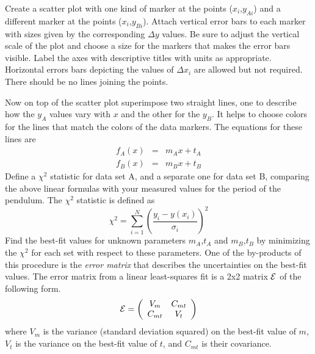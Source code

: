 \documentclass{revtex4}
\begin{document}
Create a scatter plot with one kind of marker at the points ($x_i$,$y_{Ai}$)
and a different marker at the points ($x_i$,$y_{Bi}$).  Attach vertical
error bars to each marker with sizes given by the corresponding  $\Delta y$
values.  Be sure to adjust the vertical scale of the plot and choose a size
for the markers that makes the error bars visible.  Label the axes with
descriptive titles with units as appropriate.  Horizontal errors bars
depicting the values of $\Delta x_i$ are allowed but not required.
There should be no lines joining the points.

Now on top of the scatter plot superimpose two straight lines, one to
describe how the $y_A$ values vary with $x$ and the other for the $y_B$.
It helps to choose colors for the lines that match the colors of the data
markers.  The equations for these lines are
\begin{eqnarray}
f_A(x) &=& m_A x + t_A \label{eq:lineA} \\
f_B(x) &=& m_B x + t_B \label{eq:lineB}
\end{eqnarray}
Define a $\chi^2$ statistic for data set A, and a separate one for data
set B, comparing the above linear formulas with your measured values for
the period of the pendulum.  The $\chi^2$ statistic is defined as
\begin{equation}
\chi^2 = \sum_{i=1}^N\left(\frac{y_i-y(x_i)}{\sigma_i}\right)^2
\end{equation}
Find the best-fit values for unknown parameters $m_A$,$t_A$ and $m_B$,$t_B$
by minimizing the $\chi^2$ for each set with respect to these parameters.
One of the by-products of this procedure is the {\em error
matrix} that describes the uncertainties on the best-fit values.  The error
matrix from a linear least-squares fit is a 2x2 matrix $\cal{E}$ of the
following form.
\begin{equation}
\cal{E} = \left(\begin{array}{cc}
V_m & C_{mt} \\
C_{mt} & V_t
\end{array}\right)
\end{equation}
where $V_m$ is the variance (standard deviation squared) on the best-fit
value of $m$, $V_t$ is the variance on the best-fit value of $t$, and
$C_{mt}$ is their covariance.
\end{document}
